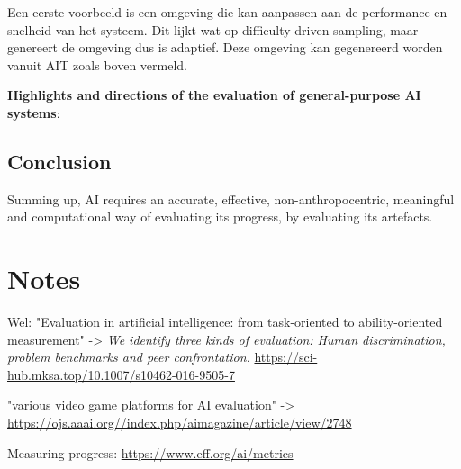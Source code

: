 \documentclass[11pt]{article}
\begin{document}
Een eerste voorbeeld is een omgeving die kan aanpassen aan de performance en snelheid van het systeem. Dit lijkt wat op difficulty-driven sampling, maar genereert de omgeving dus is adaptief. Deze omgeving kan gegenereerd worden vanuit AIT zoals boven vermeld.

\textbf{Highlights and directions of the evaluation of general-purpose AI systems}:


\subsection{Conclusion}
\label{sec:org1433d8d}

Summing up, AI requires an accurate, effective, non-anthropocentric, meaningful and computational way of evaluating its progress, by evaluating its artefacts. 

\section{Notes}
\label{sec:org648b212}

Wel: "Evaluation in artificial intelligence: from task-oriented to ability-oriented measurement" -> \emph{We identify three kinds of evaluation: Human discrimination, problem benchmarks and peer confrontation.} \cite{orallo_2016}
\url{https://sci-hub.mksa.top/10.1007/s10462-016-9505-7}

"various video game platforms for AI evaluation" -> \url{https://ojs.aaai.org//index.php/aimagazine/article/view/2748}

Measuring progress: \url{https://www.eff.org/ai/metrics}

\cite{tt1}

\cite{tt2}

\cite{tt3}

\printbibliography
\end{document}
